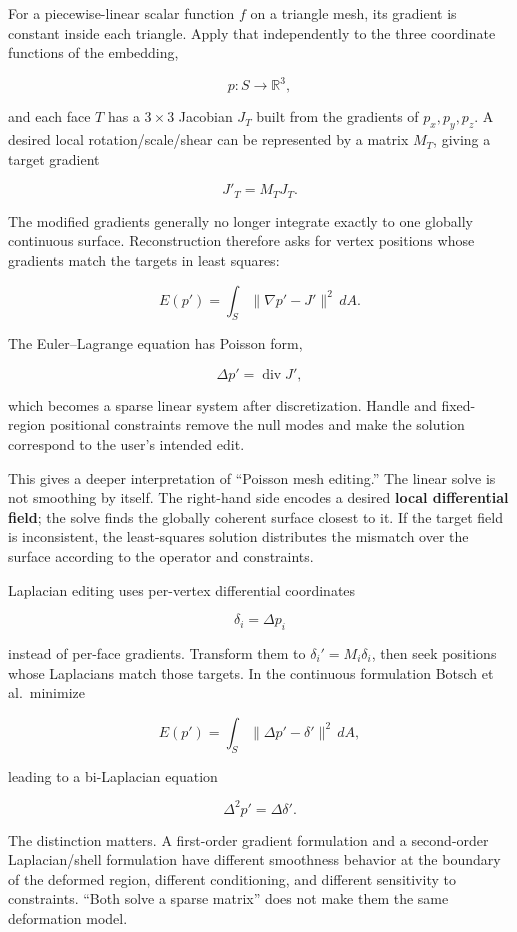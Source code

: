 For a piecewise-linear scalar function \(f\) on a triangle mesh, its gradient is constant inside each triangle. Apply that independently to the three coordinate functions of the embedding,

\[
p:S\rightarrow\mathbb R^3,
\]

and each face \(T\) has a \(3\times3\) Jacobian \(J_T\) built from the gradients of \(p_x,p_y,p_z\). A desired local rotation/scale/shear can be represented by a matrix \(M_T\), giving a target gradient

\[
J'_T=M_TJ_T.
\]

The modified gradients generally no longer integrate exactly to one globally continuous surface. Reconstruction therefore asks for vertex positions whose gradients match the targets in least squares:

\[
E(p')
=
\int_S
\|\nabla p'-J'\|^2\,dA.
\]

The Euler--Lagrange equation has Poisson form,

\[
\Delta p'
=
\operatorname{div}J',
\]

which becomes a sparse linear system after discretization. Handle and fixed-region positional constraints remove the null modes and make the solution correspond to the user's intended edit.

This gives a deeper interpretation of ``Poisson mesh editing.'' The linear solve is not smoothing by itself. The right-hand side encodes a desired \textbf{local differential field}; the solve finds the globally coherent surface closest to it. If the target field is inconsistent, the least-squares solution distributes the mismatch over the surface according to the operator and constraints.

Laplacian editing uses per-vertex differential coordinates

\[
\delta_i=\Delta p_i
\]

instead of per-face gradients. Transform them to \(\delta_i'=M_i\delta_i\), then seek positions whose Laplacians match those targets. In the continuous formulation Botsch et al.~minimize

\[
E(p')
=
\int_S
\|\Delta p'-\delta'\|^2\,dA,
\]

leading to a bi-Laplacian equation

\[
\Delta^2p'
=
\Delta\delta'.
\]

The distinction matters. A first-order gradient formulation and a second-order Laplacian/shell formulation have different smoothness behavior at the boundary of the deformed region, different conditioning, and different sensitivity to constraints. ``Both solve a sparse matrix'' does not make them the same deformation model.

